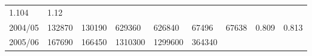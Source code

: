 \documentclass[
  spanish,
]{article}
\begin{document}
\begin{longtable}[]{@{}lllllllll@{}}
\begin{minipage}[t]{0.08\columnwidth}
1.104\strut
\end{minipage} & \begin{minipage}[t]{0.09\columnwidth}\raggedright
1.12\strut
\end{minipage}\tabularnewline
\begin{minipage}[t]{0.06\columnwidth}\raggedright
2004/05\strut
\end{minipage} & \begin{minipage}[t]{0.09\columnwidth}\raggedright
132870\strut
\end{minipage} & \begin{minipage}[t]{0.10\columnwidth}\raggedright
130190\strut
\end{minipage} & \begin{minipage}[t]{0.09\columnwidth}\raggedright
629360\strut
\end{minipage} & \begin{minipage}[t]{0.10\columnwidth}\raggedright
626840\strut
\end{minipage} & \begin{minipage}[t]{0.08\columnwidth}\raggedright
67496\strut
\end{minipage} & \begin{minipage}[t]{0.09\columnwidth}\raggedright
67638\strut
\end{minipage} & \begin{minipage}[t]{0.08\columnwidth}\raggedright
0.809\strut
\end{minipage} & \begin{minipage}[t]{0.09\columnwidth}\raggedright
0.813\strut
\end{minipage}\tabularnewline
\begin{minipage}[t]{0.06\columnwidth}\raggedright
2005/06\strut
\end{minipage} & \begin{minipage}[t]{0.09\columnwidth}\raggedright
167690\strut
\end{minipage} & \begin{minipage}[t]{0.10\columnwidth}\raggedright
166450\strut
\end{minipage} & \begin{minipage}[t]{0.09\columnwidth}\raggedright
1310300\strut
\end{minipage} & \begin{minipage}[t]{0.10\columnwidth}\raggedright
1299600\strut
\end{minipage} & \begin{minipage}[t]{0.08\columnwidth}\raggedright
364340\strut
\end{minipage} & \begin{minipage}[t]{0.09\columnwidth}\raggedright

\end{minipage}
\end{longtable}
\end{document}
